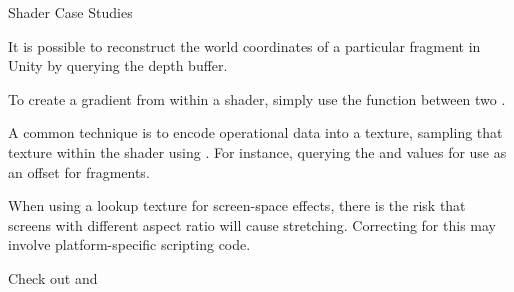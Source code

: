 \documentclass[11pt]{article}
\begin{document}
\maketitle

\begin{topic}{Shader Case Studies}
	\item It is possible to reconstruct the world coordinates of a particular fragment in Unity by querying the depth buffer.
	\item To create a gradient from within a shader, simply use the  function between two .
	\item A common technique is to encode operational data into a texture, sampling that texture within the shader using . For instance, querying the  and  values for use as an offset for fragments.
	\item When using a lookup texture for screen-space effects, there is the risk that screens with different aspect ratio will cause stretching. Correcting for this may involve platform-specific scripting code.
	\item Check out  and 
\end{topic}
\end{document}
